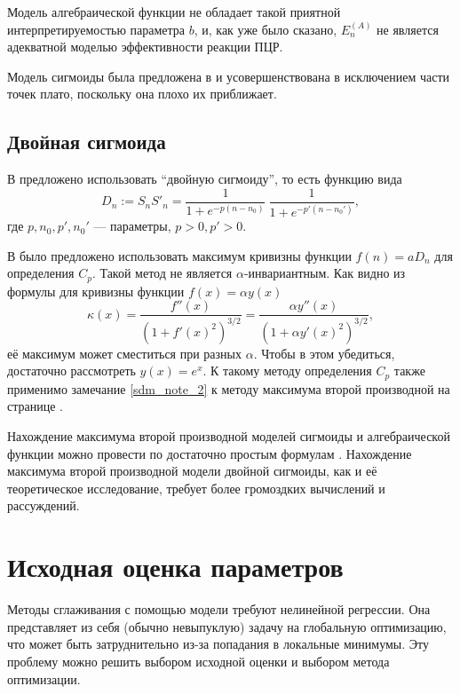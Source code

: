 Модель алгебраической функции не обладает такой приятной интерпретируемостью
параметра $b$, и, как уже было сказано, $E^{(A)}_{n}$ не является адекватной
моделью эффективности реакции ПЦР.

Модель сигмоиды была предложена в \cite{liuValidationQuantitativeMethod2002} и
усовершенствована в \cite{rutledgeSigmoidalCurvefittingRedefines2004}
исключением части точек плато, поскольку она плохо их приближает.

\subsection{Двойная сигмоида}

В
\cite{kurnikPCRElbowDetermination2007,kurnikPCRElbowDetermination2011}
предложено использовать \enquote{двойную сигмоиду}, то есть функцию вида
\[
  D_{n}:=S_{n}S'_{n}=\frac{1}{1+e^{-p(n-n_0)}}~
  \frac{1}{1+e^{-p'(n-n_0')}},
\]
где $p,n_0,p',n_0'$ --- параметры, $p>0,p'>0$.

В \cite{kurnikPCRElbowDetermination2011} было предложено использовать
максимум кривизны функции $f(n)=aD_{n}$ для определения $C_{p}$.
Такой метод не является $\alpha$\hyp{}инвариантным. Как видно из формулы для
кривизны функции $f(x)=\alpha y(x)$
\[
  \kappa(x)=\frac{f''(x)}{(1+f'(x)^{2})^{3/2}}=
  \frac{\alpha y''(x)}{(1+\alpha y'(x)^{2})^{3/2}},
\]
её максимум может сместиться при разных $\alpha$. Чтобы в этом убедиться,
достаточно рассмотреть $y(x)=e^{x}$. К такому методу определения $C_{p}$ также
применимо замечание \ref{sdm_note_2} к методу максимума второй производной
на странице \pageref{sdm_note_2}.

Нахождение максимума второй производной моделей сигмоиды и алгебраической
функции можно провести по достаточно простым формулам
\cite{zhaoComprehensiveAlgorithmQuantitative2005}. Нахождение максимума второй
производной модели двойной сигмоиды, как и её теоретическое исследование,
требует более громоздких вычислений и рассуждений.

\section{Исходная оценка параметров}\label{sec:initial}

Методы сглаживания с помощью модели требуют нелинейной регрессии. Она
представляет из себя (обычно невыпуклую) задачу на глобальную оптимизацию, что
может быть затруднительно из-за попадания в локальные минимумы. Эту проблему
можно решить выбором исходной оценки и выбором метода оптимизации.

